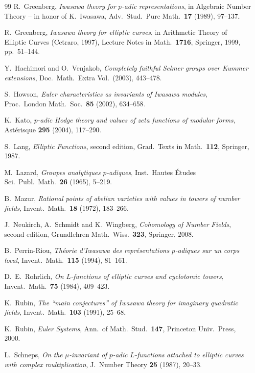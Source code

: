 \documentclass[11pt]{article}
\theoremstyle{definition}
\theoremstyle{remark}
\begin{document}
\begin{thebibliography}{99}
R.~Greenberg,
\emph{Iwasawa theory for \(p\)-adic representations},
in Algebraic Number Theory -- in honor of K.~Iwasawa,
Adv.\ Stud.\ Pure Math.\ \textbf{17} (1989), 97--137.

R.~Greenberg,
\emph{Iwasawa theory for elliptic curves},
in Arithmetic Theory of Elliptic Curves (Cetraro, 1997),
Lecture Notes in Math.\ \textbf{1716}, Springer, 1999, pp.~51--144.

Y.~Hachimori and O.~Venjakob,
\emph{Completely faithful Selmer groups over Kummer extensions},
Doc.\ Math.\ Extra Vol.\ (2003), 443--478.

S.~Howson,
\emph{Euler characteristics as invariants of Iwasawa modules},
Proc.\ London Math.\ Soc.\ \textbf{85} (2002), 634--658.

K.~Kato,
\emph{\(p\)-adic Hodge theory and values of zeta functions of modular forms},
Ast\'erisque \textbf{295} (2004), 117--290.

S.~Lang,
\emph{Elliptic Functions},
second edition, Grad.\ Texts in Math.\ \textbf{112}, Springer, 1987.

M.~Lazard,
\emph{Groupes analytiques \(p\)-adiques},
Inst.\ Hautes \'Etudes Sci.\ Publ.\ Math.\ \textbf{26} (1965), 5--219.

B.~Mazur,
\emph{Rational points of abelian varieties with values in towers of number fields},
Invent.\ Math.\ \textbf{18} (1972), 183--266.

J.~Neukirch, A.~Schmidt and K.~Wingberg,
\emph{Cohomology of Number Fields},
second edition, Grundlehren Math.\ Wiss.\ \textbf{323}, Springer, 2008.

B.~Perrin-Riou,
\emph{Th\'eorie d'Iwasawa des repr\'esentations \(p\)-adiques sur un corps local},
Invent.\ Math.\ \textbf{115} (1994), 81--161.

D.~E.~Rohrlich,
\emph{On \(L\)-functions of elliptic curves and cyclotomic towers},
Invent.\ Math.\ \textbf{75} (1984), 409--423.

K.~Rubin,
\emph{The ``main conjectures'' of Iwasawa theory for imaginary quadratic fields},
Invent.\ Math.\ \textbf{103} (1991), 25--68.

K.~Rubin,
\emph{Euler Systems},
Ann.\ of Math.\ Stud.\ \textbf{147}, Princeton Univ.\ Press, 2000.

L.~Schneps,
\emph{On the \(\mu\)-invariant of \(p\)-adic \(L\)-functions attached to elliptic curves with complex multiplication},
J.\ Number Theory \textbf{25} (1987), 20--33.


\end{thebibliography}
\end{document}
